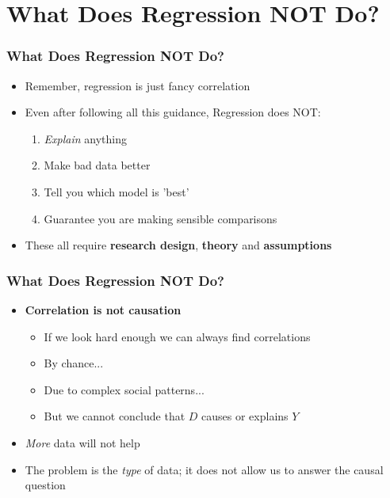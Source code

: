 \documentclass[xcolor=x11names,compress]{beamer}\usepackage[]{graphicx}\usepackage[]{color}
\newenvironment{knitrout}{}{} %
\renewcommand{\(}{\begin{columns}}
\renewcommand{\)}{\end{columns}}
\newcommand{\<}[1]{\begin{column}{#1}}
\renewcommand{\>}{\end{column}}
\begin{document}
\begin{frame}
\begin{multicols}{2}
\begin{knitrout}
\end{knitrout}
\end{multicols}
\end{frame}

\section{What Does Regression NOT Do?}

\begin{frame}
\frametitle{What Does Regression NOT Do?}
\begin{itemize}
\item Remember, regression is just fancy correlation
\item Even after following all this guidance, Regression does NOT:
\begin{enumerate}
\item \textit{Explain} anything
\item Make bad data better
\item Tell you which model is 'best'
\item Guarantee you are making sensible comparisons
\end{enumerate}
\item These all require \textbf{research design}, \textbf{theory} and \textbf{assumptions}
\end{itemize}
\end{frame}

\begin{frame}
\frametitle{What Does Regression NOT Do?}
\begin{itemize}
\item \textbf{Correlation is not causation}
\pause
\begin{itemize}
\item If we look hard enough we can always find correlations
\pause
\item By chance...
\pause
\item Due to complex social patterns...
\pause
\item But we cannot conclude that $D$ causes or explains $Y$
\pause
\end{itemize}
\item \textit{More} data will not help
\pause
\item The problem is the \textit{type} of data; it does not allow us to answer the causal question 
\end{itemize}
\end{frame}


\end{document}
